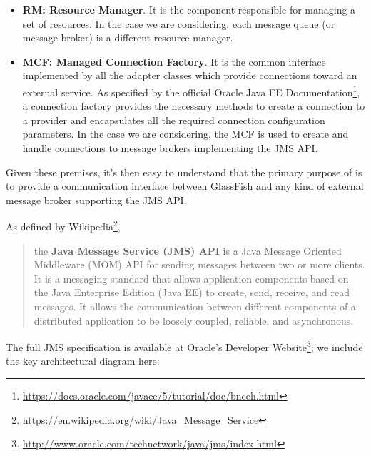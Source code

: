 \begin{itemize}
	\item \textbf{RM: Resource Manager}. It is the component responsible for managing a set of resources. In the case we are considering, each message queue (or message broker) is a different resource manager. 
	\item \textbf{MCF: Managed Connection Factory}. It is the common interface implemented by all the adapter classes which provide connections toward an external service. As specified by the official Oracle Java EE Documentation\footnote{\url{https://docs.oracle.com/javaee/5/tutorial/doc/bnceh.html}}, a connection factory provides the necessary methods to create a connection to a provider and encapsulates all the required connection configuration parameters. In the case we are considering, the MCF is used to create and handle connections to message brokers implementing the JMS API.
\end{itemize}

Given these premises, it's then easy to understand that the primary purpose of  is to provide a communication interface between GlassFish and any kind of external message broker supporting the JMS API.  

As defined by Wikipedia\footnote{\url{https://en.wikipedia.org/wiki/Java_Message_Service}},
\begin{quote}the \textbf{Java Message Service (JMS) API} is a Java Message Oriented Middleware (MOM) API for sending messages between two or more clients. It is a messaging standard that allows application components based on the Java Enterprise Edition (Java EE) to create, send, receive, and read messages. It allows the communication between different components of a distributed application to be loosely coupled, reliable, and asynchronous.
\end{quote}

The full JMS specification is available at Oracle's Developer Website\footnote{\url{http://www.oracle.com/technetwork/java/jms/index.html}}; we include the key architectural diagram here: 
\begin{figure}[H]
\centering
{}
\end{figure}

